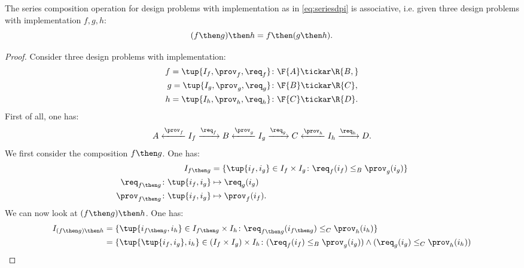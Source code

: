 \begin{lemma}
The series composition operation for design problems with implementation as in \cref{eq:seriesdpi} is associative, i.e. given three design problems with implementation $f,g,h$:
\begin{equation}
    (f\then g)\then h = f\then (g\then h).
\end{equation}
\end{lemma}
\begin{proof}
Consider three design problems with implementation:
\begin{equation}
    \begin{aligned}
    f=\tup{{I_f, \prov_f, \req_f} }&\colon \F{A} \tickar\R{B,}\\
    g=\tup{I_g, \prov_g, \req_g}&\colon \F{B} \tickar \R{C},\\
    h=\tup{I_h, \prov_h, \req_h}&\colon \F{C} \tickar \R{D}.
    \end{aligned}
\end{equation}
First of all, one has:
\begin{equation}
    A \xleftarrow{\prov_f} I_f \xrightarrow{\req_f} B
      \xleftarrow{\prov_g} I_g \xrightarrow{\req_g} C
      \xleftarrow{\prov_h} I_h \xrightarrow{\req_h} D.
\end{equation}
We first consider the composition $f\then g$. One has:
\begin{equation}
\begin{aligned}
I_{f\then g} &= \{
                \tup{i_f,i_g} \in I_f \times I_g \colon
                \req_f(i_f) \leq_{B} \prov_g(i_g)
            \}\\
        \req_{f\then g}  \colon  \tup{i_f,i_g} &\mapsto \req_g(i_g) \\
        \prov_{f\then g}  \colon  \tup{i_f,i_g} &\mapsto \prov_f(i_f).
\end{aligned}
\end{equation}
We can now look at $(f\then g)\then h$. One has:
\begin{equation}
\begin{aligned}
        I_{(f\then g)\then h} &= \{
                \tup{i_{f\then g},i_h} \in I_{f\then g} \times I_{h}\colon
                \req_{f\then g}(i_{f\then g}) \leq_{C} \prov_h(i_h)
            \}\\
        &=\{
                \tup{\tup{i_f, i_g},i_h} \in (I_f \times I_g) \times I_{h}\colon
                (\req_f(i_f) \leq_{B} \prov_g(i_g))
                \wedge
                (\req_g(i_g) \leq_{C} \prov_h(i_h))

\end{aligned}
\end{equation}
\end{proof}
